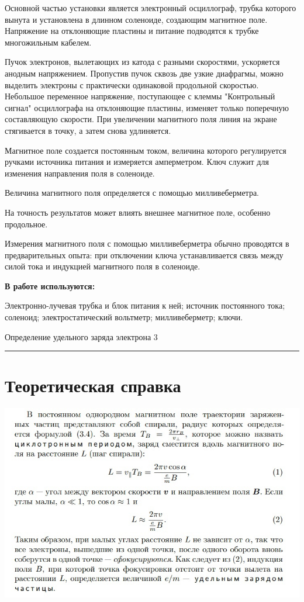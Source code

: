\documentclass[12pt,a4paper]{scrartcl}
\begin{document}
		Основной частью установки является электронный осциллограф, трубка которого вынута и установлена в длинном соленоиде, создающим магнитное поле. Напряжение на отклоняющие пластины и питание подводятся к трубке многожильным кабелем.

Пучок электронов, вылетающих из катода с разными скоростями, ускоряется анодным напряжением. Пропустив пучок сквозь две узкие диафрагмы, можно выделить электроны с практически одинаковой продольной скоростью. Небольшое переменное напряжение, поступающее с клеммы "Контрольный сигнал" осциллографа на отклоняющие пластины, изменяет только поперечную составляющую скорости. При увеличении магнитного поля линия на экране стягивается в точку, а затем снова удлиняется. 

Магнитное поле создается постоянным током, величина которого регулируется ручками источника питания и измеряется амперметром. Ключ служит для изменения направления поля в соленоиде.

Величина магнитного поля определяется с помощью милливеберметра.

На точность результатов может влиять внешнее магнитное поле, особенно продольное. 

Измерения магнитного поля с помощью милливеберметра обычно проводятся в предварительных опыта: при отключении ключа устанавливается связь между силой тока и индукцией магнитного поля в соленоиде.

	\textbf{В работе используются:}
	
	Электронно-лучевая трубка и блок питания к ней; источник постоянного тока; соленоид; электростатический вольтметр; милливеберметр; ключи.

\newpage
	
	\begin{flushleft}
		\footnotesize{Определение удельного заряда электрона} \hspace{\fill} \footnotesize{3}
		\\[-0.3cm]\noindent\rule{\textwidth}{0.3pt}
	\end{flushleft}

\section{Теоретическая справка}

	\begin{center}
		\includegraphics[scale=0.7]{THEO_1.jpg}
	\end{center}
	
\end{document}
